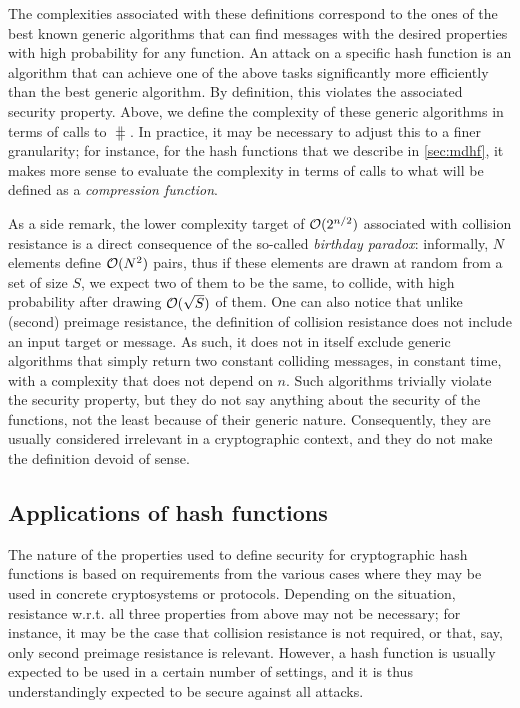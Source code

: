 The complexities associated with these definitions correspond to the ones of the best known generic algorithms that can find messages with the desired
properties with high probability for any function. An attack on a specific hash function is an algorithm that can achieve one of the above tasks significantly
more efficiently than the best generic algorithm. By definition, this violates the associated security property.
Above, we define the complexity of these generic algorithms in terms of calls to $\hash$. In practice, it may be necessary to adjust
this to a finer granularity; for instance, for the \merkdam hash functions that we describe in \autoref{sec:mdhf}, it makes more sense to evaluate the complexity
in terms of calls to what will be defined as a \emph{compression function}.

As a side remark, the lower complexity target of $\operatorname{\mathcal{O}}(2^{n/2})$ associated with collision resistance is a direct consequence of the so-called \emph{birthday paradox}: informally,
$N$ elements define $\operatorname{\mathcal{O}}(N^2)$ pairs, thus if these elements are drawn at random from a set of size $S$, we expect two of them to be the same, \ie to collide,
with high probability after drawing $\operatorname{\mathcal{O}}(\sqrt{S})$ of them.
One can also notice that unlike (second) preimage resistance, the definition of collision resistance does not include an input target or message. As such, it does not in itself
exclude generic algorithms that simply return two constant colliding messages, in constant time,
\ie with a complexity that does not depend on $n$. Such algorithms trivially violate the security property, but
they do not say anything about the security of the functions, not the least because of their generic nature. Consequently, they are usually considered irrelevant in a cryptographic context, and they do not make
the definition devoid of sense.

\subsection{Applications of hash functions}

The nature of the properties used to define security for cryptographic hash functions is based on requirements from the various cases where they may be used in concrete cryptosystems or protocols.
Depending on the situation, resistance w.r.t. all three properties from above may not be necessary; for instance, it may be the case that collision resistance is not required, or that, say, only second preimage resistance
is relevant. However, a hash function is usually expected to be used in a certain number of settings, and it is thus understandingly expected to be secure against all attacks.

